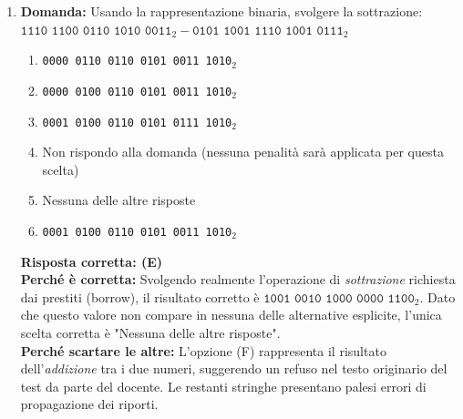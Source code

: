 \documentclass[12pt, a4paper]{article}
\begin{document}
\begin{enumerate}
    \item \textbf{Domanda:} Usando la rappresentazione binaria, svolgere la sottrazione: \\ $\texttt{1110 1100 0110 1010 0011}_2 - \texttt{0101 1001 1110 1001 0111}_2$
    \begin{enumerate}[label=(\Alph*)]
        \item \texttt{0000 0110 0110 0101 0011 1010}$_2$
        \item \texttt{0000 0100 0110 0101 0011 1010}$_2$
        \item \texttt{0001 0100 0110 0101 0111 1010}$_2$
        \item Non rispondo alla domanda (nessuna penalità sarà applicata per questa scelta)
        \item Nessuna delle altre risposte
        \item \texttt{0001 0100 0110 0101 0011 1010}$_2$
    \end{enumerate}
    \textbf{Risposta corretta: (E)} \\
    \textbf{Perché è corretta:} Svolgendo realmente l'operazione di \textit{sottrazione} richiesta dai prestiti (borrow), il risultato corretto è $\texttt{1001 0010 1000 0000 1100}_2$. Dato che questo valore non compare in nessuna delle alternative esplicite, l'unica scelta corretta è "Nessuna delle altre risposte". \\
    \textbf{Perché scartare le altre:} L'opzione (F) rappresenta il risultato dell'\textit{addizione} tra i due numeri, suggerendo un refuso nel testo originario del test da parte del docente. Le restanti stringhe presentano palesi errori di propagazione dei riporti.
    

\end{enumerate}
\end{document}
